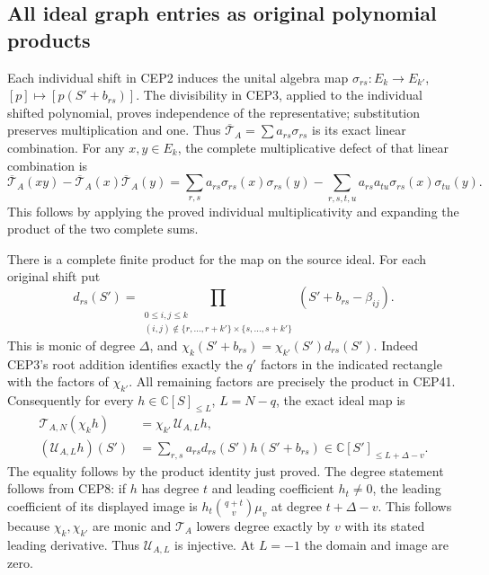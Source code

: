 \documentclass[11pt,a4paper]{article}
\begin{document}
\subsection{All ideal graph entries as original polynomial products}

Each individual shift in CEP2 induces the unital algebra map
$\sigma_{rs}:E_k\to E_{k'}$, $[p]\mapsto[p(S'+b_{rs})]$.
The divisibility in CEP3, applied to the individual shifted
polynomial, proves independence of the representative; substitution
preserves multiplication and one. Thus
$\overline{\mathcal T}_A=\sum a_{rs}\sigma_{rs}$ is its exact
linear combination. For any $x,y\in E_k$, the complete
multiplicative defect of that linear combination is
\[
 \overline{\mathcal T}_A(xy)
   -\overline{\mathcal T}_A(x)\overline{\mathcal T}_A(y)
 =\sum_{r,s}a_{rs}\sigma_{rs}(x)\sigma_{rs}(y)
   -\sum_{r,s,t,u}a_{rs}a_{tu}
                        \sigma_{rs}(x)\sigma_{tu}(y).
 \tag{CEP40}
\]
This follows by applying the proved individual multiplicativity
and expanding the product of the two complete sums.

There is a complete finite product for the map on the source ideal.
For each original shift put
\[
 d_{rs}(S')=
 \prod_{\substack{0\le i,j\le k\\
  (i,j)\notin\{r,\ldots,r+k'\}\times\{s,\ldots,s+k'\}}}
                   (S'+b_{rs}-\beta_{ij}).
 \tag{CEP41}
\]
This is monic of degree $\Delta$, and
$\chi_k(S'+b_{rs})=\chi_{k'}(S')d_{rs}(S')$.
Indeed CEP3's root addition identifies exactly the $q'$ factors
in the indicated rectangle with the factors of $\chi_{k'}$.
All remaining factors are precisely the product in CEP41.
Consequently for every $h\in\mathbb C[S]_{\le L}$,
$L=N-q$, the exact ideal map is
\[
 \begin{split}
 \mathcal T_{A,N}(\chi_kh)&=\chi_{k'}\,\mathcal U_{A,L}h,\\
 (\mathcal U_{A,L}h)(S')&=\sum_{r,s}a_{rs}
                     d_{rs}(S')h(S'+b_{rs})
                  \in\mathbb C[S']_{\le L+\Delta-v}.
 \end{split}\tag{CEP42}
\]
The equality follows by the product identity just proved. The
degree statement follows from CEP8: if $h$ has degree $t$ and
leading coefficient $h_t\ne0$, the leading coefficient of its
displayed image is
$h_t\binom{q+t}{v}\mu_v$ at degree $t+\Delta-v$.
This follows because $\chi_k,\chi_{k'}$ are monic and
$\mathcal T_A$ lowers degree exactly by $v$ with its stated
leading derivative. Thus $\mathcal U_{A,L}$ is injective.
At $L=-1$ the domain and image are zero.
\end{document}
